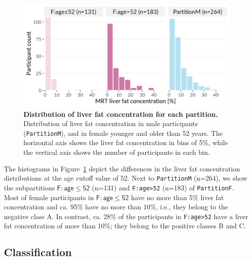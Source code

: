 \documentclass[
  oneside]{book}
\begin{document}
\begin{figure}[htbp]

{\centering \includegraphics[width=0.75\linewidth]{figures/03-histogram-partitions-age-liverfat} 

}

\caption{\textbf{Distribution of liver fat concentration for each partition.} Distribution of liver fat concentration in male participants (\texttt{PartitionM}), and in female younger and older than 52 years. The horizontal axis shows the liver fat concentration in bins of 5\%, while the vertical axis shows the number of participants in each bin.}\label{fig:03-histogram-partitions-age-liverfat}
\end{figure}

The histograms in Figure~\ref{fig:03-histogram-partitions-age-liverfat} depict the differences in the liver fat concentration distributions at the age cutoff value of 52.
Next to \texttt{PartitionM} (n=264), we show the subpartitions \(\mathsf{F:age\leq{}52}\) (n=131) and \texttt{F:age\textgreater{}52} (n=183) of \texttt{PartitionF}.
Most of female participants in \(\mathsf{F:age\leq{}52}\) have no more than 5\% liver fat concentration and ca. 95\% have no more than 10\%, i.e., they belong to the negative class A.
In contrast, ca. 28\% of the participants in \texttt{F:age\textgreater{}52} have a liver fat concentration of more than 10\%; they belong to the positive classes B and C.

\hypertarget{imm-workflow-classification}{%
\subsection{Classification}\label{imm-workflow-classification}}
\end{document}
